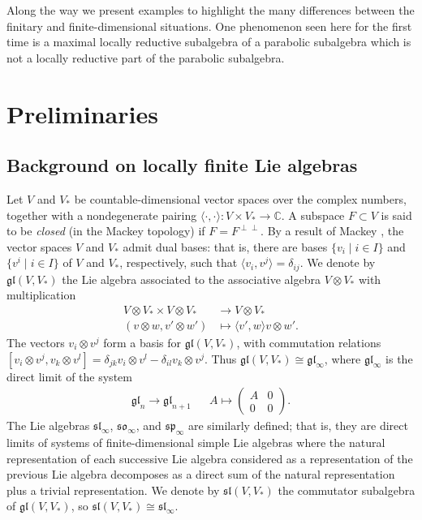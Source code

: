 \documentclass{amsart}
\theoremstyle{definition}
\theoremstyle{remark}
\numberwithin{equation}{section}
\newcommand {\C} {\mathbb{C}}
\def\gl{\mathfrak {gl}}
\def\sl{\mathfrak{sl}}
\def\so{\mathfrak{so}}
\def\sp{\mathfrak{sp}}
\begin{document}
Along the way we present examples to highlight the many differences between the finitary and finite-dimensional situations.  One phenomenon seen here for the first time is a maximal locally reductive subalgebra of a parabolic subalgebra which is not a locally reductive part of the parabolic subalgebra.


\section{Preliminaries}


\subsection{Background on locally finite Lie algebras}

Let $V$ and $V_*$ be countable-dimensional vector spaces over the complex numbers, together with a nondegenerate pairing $\langle \cdot , \cdot \rangle : V \times V_* \rightarrow \C$.  A subspace $F \subset V$ is said to be \emph{closed} (in the Mackey topology) if $F = F^{\perp \perp}$.  By a result of Mackey \cite{Mackey}, the vector spaces $V$ and $V_*$ admit dual bases: that is, there are bases $\{v_i \mid i \in I\}$ and $\{ v^i \mid i \in I \}$ of $V$ and $V_*$, respectively, such that $\langle v_i , v^j \rangle = \delta_{ij}$.  We denote by $\gl(V,V_*)$ the Lie algebra associated to the associative algebra $V \otimes V_*$ with multiplication
\begin{align*}
V \otimes V_* \times V \otimes V_* & \rightarrow V \otimes V_* \\
(v \otimes w , v' \otimes w' ) & \mapsto \langle v' , w \rangle v \otimes w'.
\end{align*}
The vectors $v_i \otimes v^j$ form a basis for $\gl(V,V_*)$, with commutation relations $[ v_i \otimes v^j , v_k \otimes v^l ] = \delta_{jk} v_i \otimes v^l - \delta_{il} v_k \otimes v^j$.  Thus $\gl(V,V_*) \cong \gl_\infty$, where $\gl_\infty$ is the direct limit of the system
\begin{eqnarray*}
\gl_n \rightarrow \gl_{n+1} && A \mapsto \left( \begin{matrix} A & 0 \\ 0 & 0 \end{matrix} \right) .
\end{eqnarray*}
The Lie algebras $\sl_\infty$, $\so_\infty$, and $\sp_\infty$ are similarly defined; that is, they are direct limits of systems of finite-dimensional simple Lie algebras where the natural representation of each successive Lie algebra considered as a representation of the previous Lie algebra decomposes as a direct sum of the natural representation plus a trivial representation.  We denote by $\sl(V,V_*)$ the commutator subalgebra of $\gl(V,V_*)$, so $\sl(V,V_*) \cong \sl_\infty$.
\end{document}
